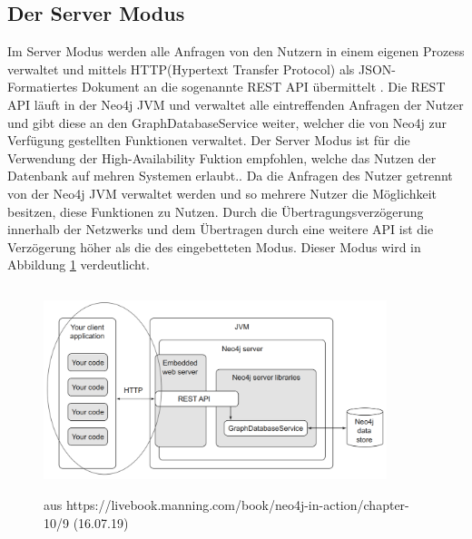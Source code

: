\subsection{Der Server Modus} \label{Server}
Im Server Modus werden alle Anfragen von den Nutzern in einem eigenen Prozess verwaltet und mittels HTTP(Hypertext Transfer Protocol) als JSON-Formatiertes Dokument an die sogenannte REST API übermittelt \parencite{robinson2013graph}. Die REST API läuft in der Neo4j JVM und  verwaltet alle eintreffenden Anfragen der Nutzer und gibt diese an den GraphDatabaseService weiter, welcher die von Neo4j zur Verfügung gestellten Funktionen verwaltet. \newline 
Der Server Modus ist für die Verwendung der High-Availability Fuktion empfohlen, welche das Nutzen der Datenbank auf mehren Systemen erlaubt.\parencite{raj2015neo4j}. Da die Anfragen des Nutzer getrennt von der Neo4j JVM verwaltet werden und so mehrere Nutzer die Möglichkeit besitzen, diese Funktionen zu Nutzen. Durch die  Übertragungsverzögerung innerhalb der Netzwerks und dem Übertragen durch eine weitere API ist die Verzögerung höher als die des eingebetteten Modus. Dieser Modus wird in Abbildung \ref{fig:Server} verdeutlicht.
\begin{figure}[!htb]
	\centering
	\includegraphics [width=10cm, height=6cm]{Figures/server}
	\caption[Server]{aus https://livebook.manning.com/book/neo4j-in-action/chapter-10/9 (16.07.19)}
	\label{fig:Server}
\end{figure}

